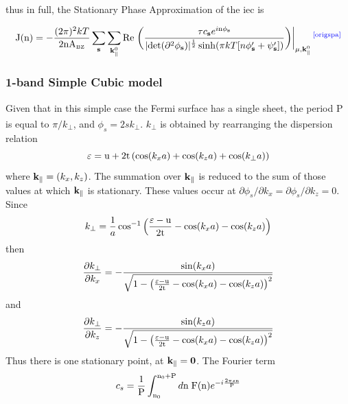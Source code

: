 \documentclass[a4paper, 12pt]{article}
\newcommand{\site}[1]{\textsuperscript{\textcolor{blue}{\cite{#1}}}}
\begin{document}
\normalsize \justify \quad 
thus in full, the Stationary Phase Approximation of the \gls{iec} is

\begin{equation}\label{spa}
	{\rm J(n)} = -\frac{(2\pi)^2{kT}}{2{\rm nA_{\scriptscriptstyle BZ}}}\sum_{\bf s} \sum_{{\bf k}_\parallel^0}{\rm Re}\left.\left(\frac{\tau  c_{\bf s}e^{i{\rm n}\phi_{\bf s}}}{\vert {\rm det}(\partial^2\phi_{\bf s})\vert^\frac{1}{2}\sinh(\pi kT[n\phi_{\bf s} '+\psi_{\bf s} '])} \right) \right|_{\mu , {\bf k}_\parallel^0}\site{origspa}
\end{equation}
\subsubsection{1-band Simple Cubic model}
	Given that in this simple case the Fermi surface has a single sheet, the period P is equal to $\pi/k_\perp$, and $\phi_s = 2sk_\perp$\textcolor{blue}{\textsuperscript{\cite{rev3}}}.
	$k_\perp$ is obtained by rearranging the dispersion relation
	\begin{equation}\label{dispersion}
		\varepsilon = {\rm u + 2t}\left(\cos(k_x a) + \cos(k_z a)+\cos(k_\perp a)\right)	
	\end{equation}
	where ${\bf k}_\parallel = (k_x, k_z)$. 
	The summation over $\rm\bf k_\parallel$ is reduced to the sum of those values at which $\rm\bf k_\parallel$ is stationary. These values occur at $\partial\phi_s/\partial k_x= \partial\phi_s/\partial k_z= 0$.
	Since
	\begin{equation}
		k_\perp \rm= \frac{1}{\mathnormal a}\cos^{-1}\Big(\frac{\varepsilon - u}{2t} - \mathnormal{\cos(k_x  a)-\cos(k_z  a)}\Big)
	\end{equation}
	then
	\begin{equation}
		\frac{\partial k_\perp}{\partial k_x} = -\frac{\sin(k_x a)}{\sqrt{1-\left(\frac{\varepsilon -{\rm u}}{2{\rm t}}-\cos(k_x a)-\cos(k_z a)\right)^2}}
	\end{equation}
	and
	\begin{equation}
		\frac{\partial k_\perp}{\partial k_z} = -\frac{\sin(k_z a)}{\sqrt{1-\left(\frac{\varepsilon -{\rm u}}{2{\rm t}}-\cos(k_x a)-\cos(k_z a)\right)^2}}
	\end{equation}
	Thus there is one stationary point, at $\rm\bf k_\parallel = 0$.
	The Fourier term
	\begin{equation}
		c_s= \frac{1}{\rm P} \int_{{\rm n}_0}^{{\rm n}_0+{\rm P}} d{\rm n \;F(n)}e^{- i\frac{2\pi s \rm n}{\rm P}}
	\end{equation}
\end{document}
